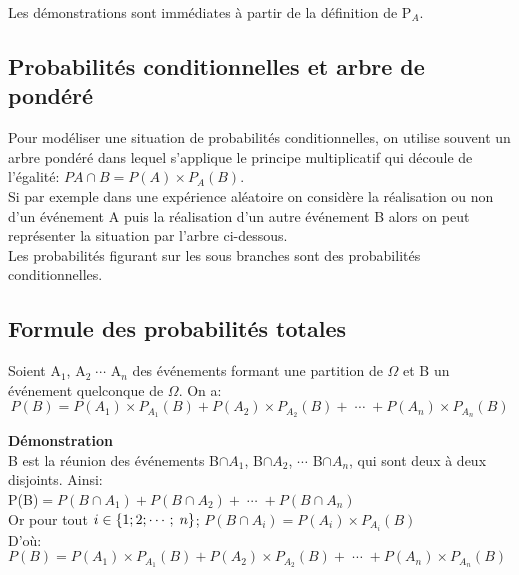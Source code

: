 Les démonstrations sont immédiates à partir de la définition de  P$ _{A} $.
\subsection{Probabilités conditionnelles et arbre de pondéré}


 Pour   modéliser  une situation de probabilités conditionnelles,  on utilise  souvent un arbre  pondéré  dans lequel s'applique  le principe multiplicatif  qui découle de l'égalité:\; $P A\cap B=P(A) \times P_{A}(B)$.\\ Si par exemple dans une expérience aléatoire  on considère la réalisation ou non d'un événement A   puis  la réalisation d'un autre événement B alors on peut représenter la situation par l'arbre ci-dessous.\\ Les probabilités figurant sur les sous branches sont des probabilités conditionnelles. 
 

  \subsection{Formule des probabilités totales}
\begin{theorem}
Soient  A$ _{1} $,  A$ _{2} \;  \cdots   $ \; A$ _{n} $  des événements formant une partition de $ \Omega $  et B un événement quelconque de $ \Omega $.  On a: 
$$ P(B)= P(A_{1}) \times P_{A_{1}}(B)+P(A_{2}) \times P_{A_{2}}(B)+\;\cdots\;  +P(A_{n}) \times P_{A_{n}}(B)$$

\end{theorem}

\textbf{Démonstration}\\
B est la réunion des événements B$ \cap A_{1} $,  B$ \cap A_{2} $, \;$ \cdots $\; B$ \cap A_{n} $,  qui sont  deux à deux disjoints.  Ainsi:\\
P(B)$ = P(B\cap A_{1})+P(B\cap A_{2}) +\;\cdots\;  +P(B\cap A_{n})$\\
 Or pour tout $ i\in\left\{1; 2; \cdots ;\; n\right\} $;\;\;  $P(B\cap A_{i})= P(A_{i}) \times P_{A_{i}}(B) $\\
  D'où:  \;\; $P(B) = P(A_{1}) \times P_{A_{1}}(B)+P(A_{2}) \times P_{A_{2}}(B)+\;\cdots\;  +P(A_{n}) \times P_{A_{n}}(B)$\\
  

